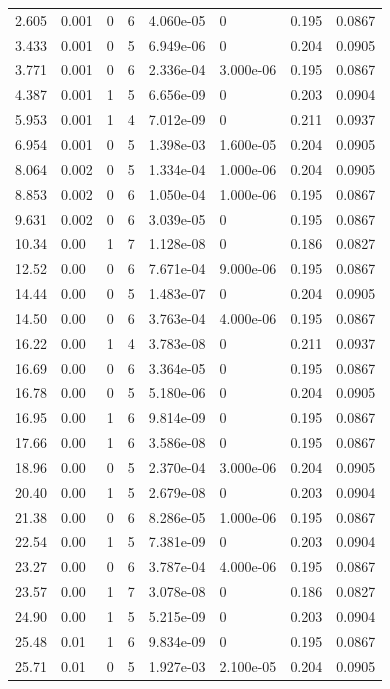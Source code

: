 \documentclass[preview]{standalone}
\begin{document}
{{\begin{tabular}{L{1.2cm}C{1.2cm} C{0.3cm}C{0.5cm} C{1.4cm}C{1.4cm} C{1.4cm}C{1.4cm}}
  2.605  &  0.001  & 0     &  6 &  4.060e-05  & 0  & 0.195 &  0.0867   \\ 
  3.433  &  0.001  & 0     &  5 &  6.949e-06  & 0  & 0.204 &  0.0905   \\ 
  3.771  &  0.001  & 0     &  6 &  2.336e-04  & 3.000e-06  & 0.195 &  0.0867   \\ 
  4.387  &  0.001  & 1     &  5 &  6.656e-09  & 0  & 0.203 &  0.0904   \\ 
  5.953  &  0.001  & 1     &  4 &  7.012e-09  & 0  & 0.211 &  0.0937   \\ 
  6.954  &  0.001  & 0     &  5 &  1.398e-03  & 1.600e-05  & 0.204 &  0.0905   \\ 
  8.064  &  0.002  & 0     &  5 &  1.334e-04  & 1.000e-06  & 0.204 &  0.0905   \\ 
  8.853  &  0.002  & 0     &  6 &  1.050e-04  & 1.000e-06  & 0.195 &  0.0867   \\ 
  9.631  &  0.002  & 0     &  6 &  3.039e-05  & 0  & 0.195 &  0.0867   \\ 
  10.34  &  0.00  & 1     &  7 &  1.128e-08  & 0  & 0.186 &  0.0827   \\ 
  12.52  &  0.00  & 0     &  6 &  7.671e-04  & 9.000e-06  & 0.195 &  0.0867   \\ 
  14.44  &  0.00  & 0     &  5 &  1.483e-07  & 0  & 0.204 &  0.0905   \\ 
  14.50  &  0.00  & 0     &  6 &  3.763e-04  & 4.000e-06  & 0.195 &  0.0867   \\ 
  16.22  &  0.00  & 1     &  4 &  3.783e-08  & 0  & 0.211 &  0.0937   \\ 
  16.69  &  0.00  & 0     &  6 &  3.364e-05  & 0  & 0.195 &  0.0867   \\ 
  16.78  &  0.00  & 0     &  5 &  5.180e-06  & 0  & 0.204 &  0.0905   \\ 
  16.95  &  0.00  & 1     &  6 &  9.814e-09  & 0  & 0.195 &  0.0867   \\ 
  17.66  &  0.00  & 1     &  6 &  3.586e-08  & 0  & 0.195 &  0.0867   \\ 
  18.96  &  0.00  & 0     &  5 &  2.370e-04  & 3.000e-06  & 0.204 &  0.0905   \\ 
  20.40  &  0.00  & 1     &  5 &  2.679e-08  & 0  & 0.203 &  0.0904   \\ 
  21.38  &  0.00  & 0     &  6 &  8.286e-05  & 1.000e-06  & 0.195 &  0.0867   \\ 
  22.54  &  0.00  & 1     &  5 &  7.381e-09  & 0  & 0.203 &  0.0904   \\ 
  23.27  &  0.00  & 0     &  6 &  3.787e-04  & 4.000e-06  & 0.195 &  0.0867   \\ 
  23.57  &  0.00  & 1     &  7 &  3.078e-08  & 0  & 0.186 &  0.0827   \\ 
  24.90  &  0.00  & 1     &  5 &  5.215e-09  & 0  & 0.203 &  0.0904   \\ 
  25.48  &  0.01  & 1     &  6 &  9.834e-09  & 0  & 0.195 &  0.0867   \\ 
  25.71  &  0.01  & 0     &  5 &  1.927e-03  & 2.100e-05  & 0.204 &  0.0905   \\ 
\hline 
\end{tabular} 

}}
\end{document}
